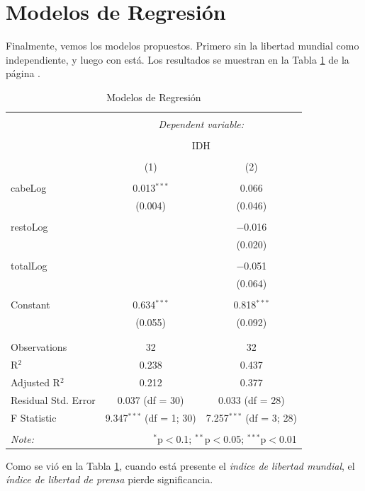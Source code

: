 \documentclass{article}
\begin{document}
\section{Modelos de Regresión}
% 
Finalmente, vemos los modelos propuestos. Primero sin la libertad mundial como independiente, y luego con está. Los resultados se muestran en la Tabla \ref{regresiones} de la página \pageref{regresiones}.
% 
% 
% 
\begin{table}[!htbp] \centering 
  \caption{Modelos de Regresión} 
  \label{regresiones} 
\begin{tabular}{@{\extracolsep{5pt}}lcc} 
\\[-1.8ex]\hline 
\hline \\[-1.8ex] 
 & \multicolumn{2}{c}{\textit{Dependent variable:}} \\ 
\cline{2-3} 
\\[-1.8ex] & \multicolumn{2}{c}{IDH} \\ 
\\[-1.8ex] & (1) & (2)\\ 
\hline \\[-1.8ex] 
 cabeLog & 0.013$^{***}$ & 0.066 \\ 
  & (0.004) & (0.046) \\ 
  & & \\ 
 restoLog &  & $-$0.016 \\ 
  &  & (0.020) \\ 
  & & \\ 
 totalLog &  & $-$0.051 \\ 
  &  & (0.064) \\ 
  & & \\ 
 Constant & 0.634$^{***}$ & 0.818$^{***}$ \\ 
  & (0.055) & (0.092) \\ 
  & & \\ 
\hline \\[-1.8ex] 
Observations & 32 & 32 \\ 
R$^{2}$ & 0.238 & 0.437 \\ 
Adjusted R$^{2}$ & 0.212 & 0.377 \\ 
Residual Std. Error & 0.037 (df = 30) & 0.033 (df = 28) \\ 
F Statistic & 9.347$^{***}$ (df = 1; 30) & 7.257$^{***}$ (df = 3; 28) \\ 
\hline 
\hline \\[-1.8ex] 
\textit{Note:}  & \multicolumn{2}{r}{$^{*}$p$<$0.1; $^{**}$p$<$0.05; $^{***}$p$<$0.01} \\ 
\end{tabular} 
\end{table} %
Como se vió en la Tabla \ref{regresiones}, cuando está presente el \emph{indice de libertad mundial}, el \emph{índice de libertad de prensa} pierde significancia.
 
\end{document}
